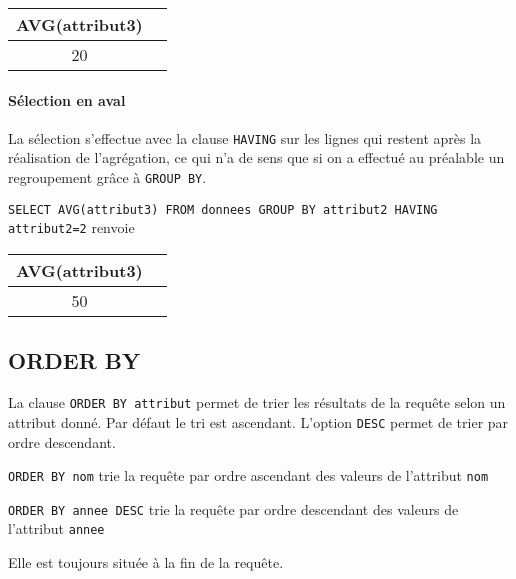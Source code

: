 \begin{center}
\begin{tabular}{|c|c|}\hline
AVG(attribut3)\\\hline
20 \\\hline
\end{tabular}
\end{center}

\paragraph{Sélection en aval}

La sélection s'effectue avec la clause \verb|HAVING| sur les lignes qui restent après la réalisation de l'agrégation, ce qui n'a de sens que si on a effectué au préalable un regroupement grâce à \verb|GROUP BY|.

\verb|SELECT AVG(attribut3) FROM donnees GROUP BY attribut2 HAVING attribut2=2| renvoie 

\begin{center}
\begin{tabular}{|c|c|}\hline
AVG(attribut3)\\\hline
50 \\\hline
\end{tabular}
\end{center}

\subsection{ORDER BY}

La clause \verb|ORDER BY attribut| permet de trier les résultats de la requête selon un attribut donné. Par défaut le tri est ascendant. L'option \verb|DESC| permet de trier par ordre descendant.

\verb|ORDER BY nom| trie la requête par ordre ascendant des valeurs de l'attribut \verb|nom|

\verb|ORDER BY annee DESC| trie la requête par ordre descendant des valeurs de l'attribut \verb|annee|

Elle est toujours située à la fin de la requête.




